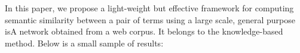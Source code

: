 In this paper, we propose a light-weight but effective framework for
computing semantic similarity %
between a pair of terms using a large scale, general purpose isA
network obtained from a web corpus. It belongs to the knowledge-based method.
Below is a small sample of results:

